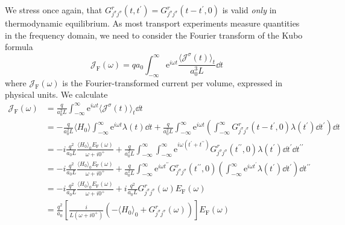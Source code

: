 We stress once again, that \(G^r_{j^{\sigma }j^{\sigma }}(t,t^{\prime} ) = G^r_{j^{\sigma }j^{\sigma }}(t-t^{\prime},0 ) \)
is valid \textit{only} in thermodynamic equilibrium.
As most transport experiments measure quantities in the frequency domain,
we need to consider the Fourier transform of the Kubo formula
\begin{equation}
    \mathcal{J}_{\text{F} }(\omega ) = q a_0 \int_{-\infty}^{\infty } \mathrm{e}^{i \omega t} \frac{\langle \mathcal{J}^{\sigma }(t) \rangle_t}{a_0^3 L}\dd{t} 
\end{equation}
where \(\mathcal{J}_{\text{F} }(\omega )\) is the Fourier-transformed current per volume, expressed in physical units.
We calculate
\begin{align}
    \mathcal{J}_{\text{F} }(\omega ) & = \frac{q}{a_0^2 L} \int_{-\infty}^{\infty }  \mathrm{e}^{i \omega t} \langle \mathcal{J}^{\sigma }(t) \rangle_t \dd{t} \nonumber                                                                                                            \\
                                     & = - \frac{q}{a_0^2 L}\langle H_0 \rangle  \int_{-\infty}^{\infty }  \mathrm{e}^{i \omega t} \lambda (t)\dd{t} 
    + \frac{q}{a_0^2 L} \int_{-\infty }^{\infty } \mathrm{e}^{i \omega t}  \left(\int_{-\infty }^{\infty }G^r_{j^{\sigma }j^{\sigma}}(t-t^{\prime},0 ) \lambda (t^{\prime} )\dd{t^{\prime} }\right) \dd{t}  \nonumber                                                                    \\
                                     & = -i \frac{q^2}{a_0 L} \frac{\langle H_0 \rangle_0 E_{\text{F} }(\omega )}{\omega + i 0^{+}  }
    + \frac{q}{a_0^2 L} \int_{-\infty }^{\infty }  \int_{-\infty }^{\infty }  \mathrm{e}^{i \omega (t^{\prime} + t^{\prime\prime}) } G^r_{j^{\sigma }j^{\sigma}}(t^{\prime\prime},0 ) \lambda (t^{\prime} ) \dd{t^{\prime} } \dd{t^{\prime\prime} }   \nonumber                     \\
                                     & = -i \frac{q^2}{a_0 L} \frac{\langle H_0 \rangle_0 E_{\text{F} }(\omega )}{\omega + i 0^{+}  }
    + \frac{q}{a_0^2 L} \int_{-\infty }^{\infty } \mathrm{e}^{i \omega  t^{\prime\prime} } G^r_{j^{\sigma }j^{\sigma}}(t^{\prime\prime},0 ) \left(\int_{-\infty }^{\infty } \mathrm{e}^{i \omega t^{\prime} } \lambda (t^{\prime} )\dd{t^{\prime} }\right)\dd{t^{\prime\prime} }   \nonumber \\
                                     & = -i \frac{q^2}{a_0 L} \frac{\langle H_0 \rangle_0 E_{\text{F} }(\omega )}{\omega + i 0^{+}  }
    + i\frac{q^2}{a_0 L} G^r_{j^{\sigma }j^{\sigma}}(\omega) E_{\text{F} }(\omega ) \nonumber                                                                                                                                                                                               \\
                                     & = \frac{q^2}{a_0} \left[\frac{i}{L(\omega +i 0^{+} )} \left(- \langle H_0 \rangle_0 + G^r_{j^{\sigma }j^{\sigma }}(\omega ) \right)  \right] E_{\text{F} }(\omega )
\end{align}
